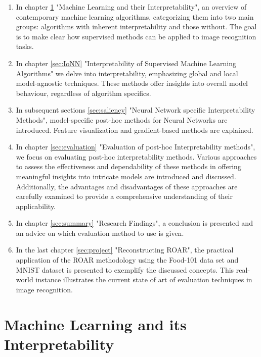 \begin{enumerate}
	
	\item In chapter \ref{sec:MLandI} "Machine Learning and their Interpretability", an overview of contemporary machine learning algorithms, categorizing them into two main groups: algorithms with inherent interpretability and those without. The goal is to make clear how supervised methods can be applied to image recognition tasks.
	\item In chapter \ref{sec:IoNN} "Interpretability of Supervised Machine Learning Algorithms" we delve into interpretability, emphasizing global and local model-agnostic techniques. These methods offer insights into overall model behaviour, regardless of algorithm specifics. 
	\item In subsequent sections \ref{sec:saliency} "Neural Network specific Interpretability Methods", model-specific post-hoc methods for Neural Networks are introduced. Feature visualization and gradient-based methods are explained.
	\item In chapter \ref{sec:evaluation} "Evaluation of post-hoc Interpretability methods", we focus on evaluating post-hoc interpretability methods. Various approaches to assess the effectiveness and dependability of these methods in offering meaningful insights into intricate models are introduced and discussed. Additionally, the advantages and disadvantages of these approaches are carefully examined to provide a comprehensive understanding of their applicability.
	\item In chapter \ref{sec:summary} "Research Findings", a conclusion is presented and an advice on which evaluation method to use is given. 
	\item In the last chapter \ref{sec:project} "Reconstructing ROAR", the practical application of the ROAR methodology using the Food-101 data set \cite{bossard14} and MNIST dataset \cite{deng2012mnist} is presented to exemplify the discussed concepts. This real-world instance illustrates the current state of art of evaluation techniques in image recognition.
\end{enumerate}

\chapter{Machine Learning and its Interpretability}
\label{sec:MLandI}

